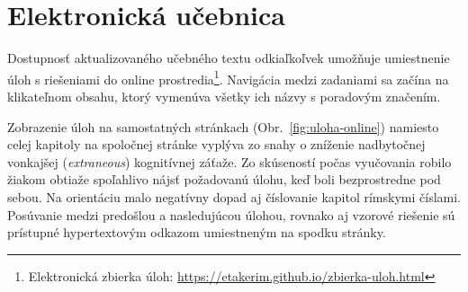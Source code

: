 \section{Elektronická učebnica}
Dostupnosť aktualizovaného učebného textu odkiaľkoľvek umožňuje umiestnenie úloh s riešeniami do online prostredia\footnote{Elektronická zbierka úloh: \url{https://etakerim.github.io/zbierka-uloh.html}}. Navigácia medzi zadaniami sa začína na klikateľnom obsahu, ktorý vymenúva všetky ich názvy s poradovým značením.

Zobrazenie úloh na samostatných stránkach (Obr.~\ref{fig:uloha-online}) namiesto celej kapitoly na spoločnej stránke vyplýva zo snahy o zníženie nadbytočnej vonkajšej (\emph{extraneous}) kognitívnej záťaže. Zo skúseností počas vyučovania robilo žiakom obtiaže spoľahlivo nájsť požadovanú úlohu, keď boli bezprostredne pod sebou. Na orientáciu malo negatívny dopad aj číslovanie kapitol rímskymi číslami. Posúvanie medzi predošlou a nasledujúcou úlohou, rovnako aj vzorové riešenie sú prístupné hypertextovým odkazom umiestneným na spodku stránky.

